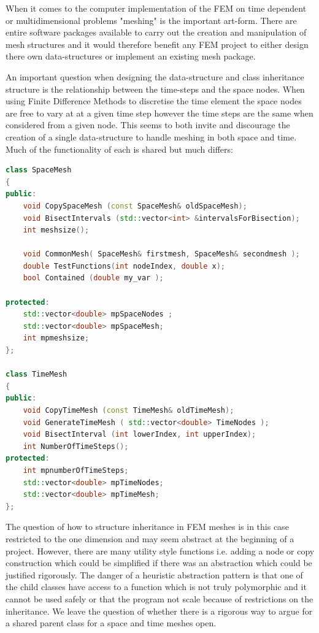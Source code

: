 \documentclass{uonmathreport}
\theoremstyle{definition}
\theoremstyle{problem}
\theoremstyle{theorem}
\begin{document}
When it comes to the computer implementation of the FEM on time dependent or multidimensional problems "meshing" is the important art-form. There are entire software packages available to carry out the creation and manipulation of mesh structures and it would therefore benefit any FEM project to either design there own data-structures or implement an existing mesh package. 

An important question when designing the data-structure and class inheritance structure is the relationship between the time-steps and the space nodes. When using Finite Difference Methods to discretise the time element the space nodes are free to vary at at a given time step however the time steps are the same when considered from a given node. This seems to both invite and discourage the creation of a single data-structure to handle meshing in both space and time. Much of the functionality of each is shared but much differs:

\begin{lstlisting}[language=C++]
class SpaceMesh
{
public:
    void CopySpaceMesh (const SpaceMesh& oldSpaceMesh);
    void BisectIntervals (std::vector<int> &intervalsForBisection);
    int meshsize();

    void CommonMesh( SpaceMesh& firstmesh, SpaceMesh& secondmesh );
    double TestFunctions(int nodeIndex, double x);
    bool Contained (double my_var );

protected:
    std::vector<double> mpSpaceNodes ;
    std::vector<double> mpSpaceMesh;
    int mpmeshsize;
};

class TimeMesh
{
public:
    void CopyTimeMesh (const TimeMesh& oldTimeMesh);
    void GenerateTimeMesh ( std::vector<double> TimeNodes );
    void BisectInterval (int lowerIndex, int upperIndex);
    int NumberOfTimeSteps();
protected:
    int mpnumberOfTimeSteps;
    std::vector<double> mpTimeNodes;
    std::vector<double> mpTimeMesh;
};


\end{lstlisting}

The question of how to structure inheritance in FEM meshes is in this case restricted to the one dimension and may seem abstract at the beginning of a project. However, there are many utility style functions i.e. adding a node or copy construction which could be simplified if there was an abstraction which could be justified rigorously. The danger of a heuristic abstraction pattern is that one of the child classes have access to a function which is not truly polymorphic and it cannot be used safely or that the program not scale because of restrictions on the inheritance. We leave the question of whether there is a rigorous way to argue for a shared parent class for a space and time meshes open. 
\end{document}
